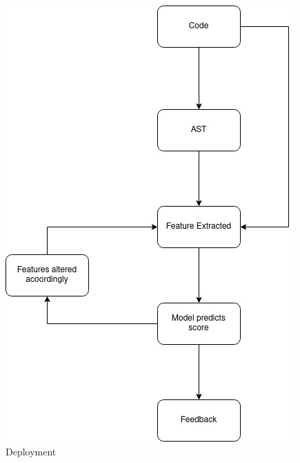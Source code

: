 \begin{figure}[h]
\centering
\includegraphics[scale=0.7]{./Deployment.jpg}
\caption{Deployment}
\label{fig1}
\end{figure}